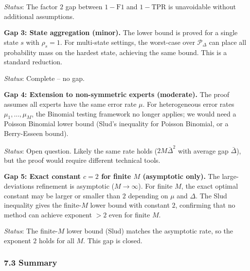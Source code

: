 \documentclass[
  12pt,
]{ctexart}
\begin{document}
\emph{Status}: The factor \(2\) gap between \(1-\text{F1}\) and
\(1-\text{TPR}\) is unavoidable without additional assumptions.

\textbf{Gap 3: State aggregation (minor).} The lower bound is proved for
a single state \(s\) with \(\rho_s = 1\). For multi-state settings, the
worst-case over \(\mathcal{P}_\Delta\) can place all probability mass on
the hardest state, achieving the same bound. This is a standard
reduction.

\emph{Status}: Complete -- no gap.

\textbf{Gap 4: Extension to non-symmetric experts (moderate).} The proof
assumes all experts have the same error rate \(\mu\). For heterogeneous
error rates \(\mu_1,\dots,\mu_M\), the Binomial testing framework no
longer applies; we would need a Poisson Binomial lower bound (Slud's
inequality for Poisson Binomial, or a Berry-Esseen bound).

\emph{Status}: Open question. Likely the same rate holds
(\(2M\bar{\Delta}^2\) with average gap \(\bar{\Delta}\)), but the proof
would require different technical tools.

\textbf{Gap 5: Exact constant \(c = 2\) for finite \(M\) (asymptotic
only).} The large-deviations refinement is asymptotic
(\(M \to \infty\)). For finite \(M\), the exact optimal constant may be
larger or smaller than \(2\) depending on \(\mu\) and \(\Delta\). The
Slud inequality gives the finite-\(M\) lower bound with constant \(2\),
confirming that no method can achieve exponent \(> 2\) even for finite
\(M\).

\emph{Status}: The finite-\(M\) lower bound (Slud) matches the
asymptotic rate, so the exponent \(2\) holds for all \(M\). This gap is
closed.

\subsubsection{7.3 Summary}\label{summary}
\end{document}

